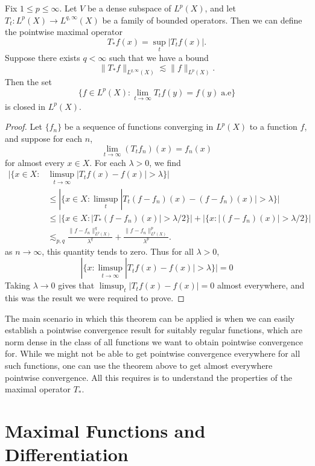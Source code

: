 \begin{theorem}
  Fix $1 \leq p \leq \infty$. Let $V$ be a dense subspace of $L^p(X)$, and let $T_t: L^p(X) \to L^{q,\infty}(X)$ be a family of bounded operators. Then we can define the pointwise maximal operator
  \[ T_* f(x) = \sup_t |T_t f(x)|. \]
  Suppose there exists $q < \infty$ such that we have a bound
  \[ \| T_* f \|_{L^{q,\infty}(X)} \lesssim \| f \|_{L^p(X)}. \]
  Then the set
  \[ \{ f \in L^p(X) : \lim_{t \to \infty} T_t f(y) = f(y)\; \text{a.e} \} \]
  is closed in $L^p(X)$.
\end{theorem}
\begin{proof}
  Let $\{ f_n \}$ be a sequence of functions converging in $L^p(X)$ to a function $f$, and suppose for each $n$,
  \[ \lim_{t \to \infty} (T_t f_n)(x) = f_n(x) \]
  for almost every $x \in X$. For each $\lambda > 0$, we find
  \begin{align*}
    |\{ x \in X: &\limsup_{t \to \infty} |T_t f(x) - f(x)| > \lambda \}|\\
    &\leq |\{ x \in X: \limsup_t |T_t(f - f_n)(x) - (f - f_n)(x)| > \lambda \}|\\
    &\leq |\{ x \in X : |T_*(f - f_n)(x)| > \lambda/2 \}| + | \{ x: |(f - f_n)(x)| > \lambda/2 \} |\\
    &\lesssim_{p,q} \frac{\| f - f_n \|_{L^p(X)}^q}{\lambda^q} + \frac{\| f - f_n \|_{L^p(X)}^p}{\lambda^p}.
  \end{align*}
  as $n \to \infty$, this quantity tends to zero. Thus for all $\lambda > 0$,
  \[ |\{ x: \limsup_{t \to \infty} |T_t f(x) - f(x)| > \lambda \}| = 0 \]
  Taking $\lambda \to 0$ gives that $\limsup_t |T_t f(x) - f(x)| = 0$ almost everywhere, and this was the result we were required to prove.
\end{proof}

The main scenario in which this theorem can be applied is when we can easily establish a pointwise convergence result for suitably regular functions, which are norm dense in the class of all functions we want to obtain pointwise convergence for. While we might not be able to get pointwise convergence everywhere for all such functions, one can use the theorem above to get almost everywhere pointwise convergence. All this requires is to understand the properties of the maximal operator $T_*$.

\section{Maximal Functions and Differentiation}

